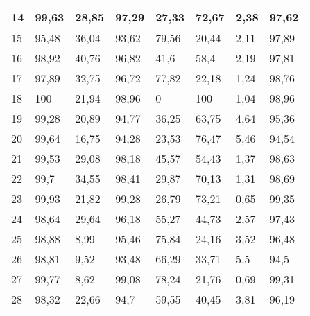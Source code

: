 \begin{longtable}[c]{|l|l|l|l|l|l|l|l|}
14              & 99,63        & 28,85        & 97,29       & 27,33         & 72,67         & 2,38          & 97,62         \\ \hline
15              & 95,48        & 36,04        & 93,62       & 79,56         & 20,44         & 2,11          & 97,89         \\ \hline
16              & 98,92        & 40,76        & 96,82       & 41,6          & 58,4          & 2,19          & 97,81         \\ \hline
17              & 97,89        & 32,75        & 96,72       & 77,82         & 22,18         & 1,24          & 98,76         \\ \hline
18              & 100          & 21,94        & 98,96       & 0             & 100           & 1,04          & 98,96         \\ \hline
19              & 99,28        & 20,89        & 94,77       & 36,25         & 63,75         & 4,64          & 95,36         \\ \hline
20              & 99,64        & 16,75        & 94,28       & 23,53         & 76,47         & 5,46          & 94,54         \\ \hline
21              & 99,53        & 29,08        & 98,18       & 45,57         & 54,43         & 1,37          & 98,63         \\ \hline
22              & 99,7         & 34,55        & 98,41       & 29,87         & 70,13         & 1,31          & 98,69         \\ \hline
23              & 99,93        & 21,82        & 99,28       & 26,79         & 73,21         & 0,65          & 99,35         \\ \hline
24              & 98,64        & 29,64        & 96,18       & 55,27         & 44,73         & 2,57          & 97,43         \\ \hline
25              & 98,88        & 8,99         & 95,46       & 75,84         & 24,16         & 3,52          & 96,48         \\ \hline
26              & 98,81        & 9,52         & 93,48       & 66,29         & 33,71         & 5,5           & 94,5          \\ \hline
27              & 99,77        & 8,62         & 99,08       & 78,24         & 21,76         & 0,69          & 99,31         \\ \hline
28              & 98,32        & 22,66        & 94,7        & 59,55         & 40,45         & 3,81          & 96,19         \\ \hline

\end{longtable}
